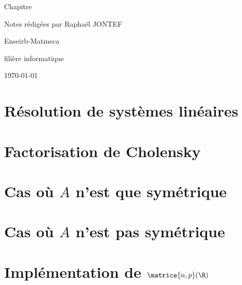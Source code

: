 \documentclass[12pt]{article}
\begin{document}



\hypersetup{pageanchor=false}
\setlength{\headheight}{15pt}
\begin{titlepage}
    \centering
    \vspace*{3cm}
    {\huge Chapitre \numeroChapitre\par}
    {\Huge \bfseries\texteNomChapitre \par} %
    \vspace{2cm}
    {\Large Notes rédigées par Raphaël JONTEF\par}
    \vspace{0.5cm}
    {\normalsize \texteNomProf \par}
    \vspace{4cm}
    {\small Enseirb-Matmeca\par}
    {\small filière informatique\par}
    \vfill
    {\large \today\par}
\end{titlepage}
\hypersetup{pageanchor=true} %

\tableofcontents
\newpage


\section{Résolution de systèmes linéaires}


\section{Factorisation de Cholensky}


\section{Cas où $A$ n'est que symétrique}


\section{Cas où $A$ n'est pas symétrique}


\section{Implémentation de $\matrice{n,p}(\R)$}


\section*{}

\end{document}
